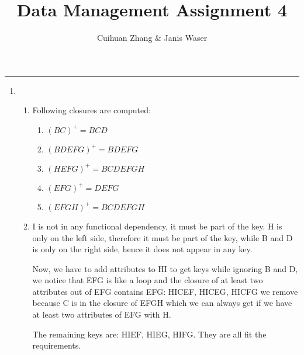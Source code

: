 \documentclass[12pt]{extarticle}
\title{Data Management Assignment 4}
\author{Cuihuan Zhang \& Janis Waser}
\begin{document}
\maketitle \vspace{-10mm}
\rule{\linewidth}{0.4pt}


\begin{flushleft}
\begin{enumerate}

\item

\begin{enumerate}
\item Following closures are computed:


\begin{enumerate}

\item  $(BC)^+=BCD$
\item $(BDEFG)^+=BDEFG$
\item $(HEFG)^+=BCDEFGH$
\item $(EFG)^+=DEFG$
\item $(EFGH)^+=BCDEFGH$
\end{enumerate}
\item I is not in any functional dependency, it must be part of the key. H is only on the left side, therefore it must be part of the key, while B and D is only on the right side, hence it does not appear in any key. 

Now, we have to add attributes to HI to get keys while ignoring B and D, we notice that EFG is like a loop and the closure of at least two attributes out of EFG contains EFG:
HICEF, HICEG, HICFG we remove because C is in the closure of EFGH which we can always get if we have at least two attributes of EFG with H. 

The remaining keys are: HIEF, HIEG, HIFG. They are all fit the requirements.
\end{enumerate}




\end{enumerate}
\end{flushleft}
\end{document}
